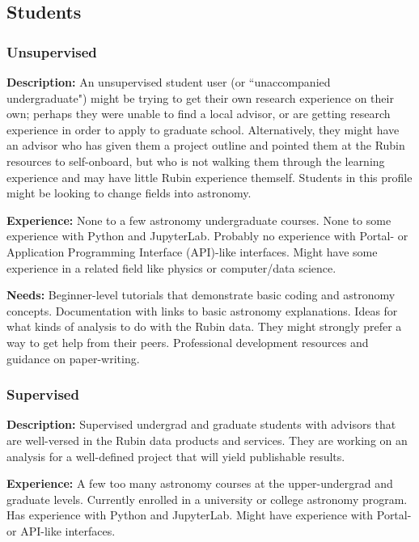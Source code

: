 \subsection{Students}

\subsubsection{Unsupervised}

\textbf{Description:} 
An unsupervised student user (or ``unaccompanied undergraduate") might be trying
to get their own research experience on their own; perhaps they were unable to find
a local advisor, or are getting research experience in order to apply to graduate school.
Alternatively, they might have an advisor who has given them a project outline and pointed
them at the Rubin resources to self-onboard, but who is not walking them through
the learning experience and may have little Rubin experience themself.
Students in this profile might be looking to change fields into astronomy.

\textbf{Experience:}
None to a few astronomy undergraduate courses.
None to some experience with Python and JupyterLab.
Probably no experience with Portal- or Application Programming Interface (API)-like interfaces.
Might have some experience in a related field like physics or computer/data science.

\textbf{Needs:}
Beginner-level tutorials that demonstrate basic coding and astronomy concepts.
Documentation with links to basic astronomy explanations.
Ideas for what kinds of analysis to do with the Rubin data.
They might strongly prefer a way to get help from their peers.
Professional development resources and guidance on paper-writing.

\subsubsection{Supervised}

\textbf{Description:} 
Supervised undergrad and graduate students with advisors that are well-versed
in the Rubin data products and services.
They are working on an analysis for a well-defined project that will yield publishable results.

\textbf{Experience:} 
A few too many astronomy courses at the upper-undergrad and graduate levels.
Currently enrolled in a university or college astronomy program.
Has experience with Python and JupyterLab.
Might have experience with Portal- or API-like interfaces.


